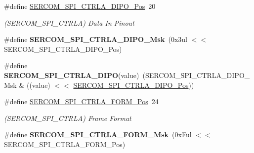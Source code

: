 \begin{DoxyCompactItemize}
\item 
\hypertarget{group___s_a_m_l21___s_e_r_c_o_m_gaefe3548f853ddf08ea9b9754bb4a77b1}{}\#define \hyperlink{group___s_a_m_l21___s_e_r_c_o_m_gaefe3548f853ddf08ea9b9754bb4a77b1}{S\+E\+R\+C\+O\+M\+\_\+\+S\+P\+I\+\_\+\+C\+T\+R\+L\+A\+\_\+\+D\+I\+P\+O\+\_\+\+Pos}~20\label{group___s_a_m_l21___s_e_r_c_o_m_gaefe3548f853ddf08ea9b9754bb4a77b1}

\begin{DoxyCompactList}\small\item\em (S\+E\+R\+C\+O\+M\+\_\+\+S\+P\+I\+\_\+\+C\+T\+R\+L\+A) Data In Pinout \end{DoxyCompactList}\item 
\hypertarget{group___s_a_m_l21___s_e_r_c_o_m_ga5b9e5ebd32c5551b385f5f245ffe0eab}{}\#define {\bfseries S\+E\+R\+C\+O\+M\+\_\+\+S\+P\+I\+\_\+\+C\+T\+R\+L\+A\+\_\+\+D\+I\+P\+O\+\_\+\+Msk}~(0x3ul $<$$<$ S\+E\+R\+C\+O\+M\+\_\+\+S\+P\+I\+\_\+\+C\+T\+R\+L\+A\+\_\+\+D\+I\+P\+O\+\_\+\+Pos)\label{group___s_a_m_l21___s_e_r_c_o_m_ga5b9e5ebd32c5551b385f5f245ffe0eab}

\item 
\hypertarget{group___s_a_m_l21___s_e_r_c_o_m_ga188fed2d9a46721deeb6465501975fb2}{}\#define {\bfseries S\+E\+R\+C\+O\+M\+\_\+\+S\+P\+I\+\_\+\+C\+T\+R\+L\+A\+\_\+\+D\+I\+P\+O}(value)~(S\+E\+R\+C\+O\+M\+\_\+\+S\+P\+I\+\_\+\+C\+T\+R\+L\+A\+\_\+\+D\+I\+P\+O\+\_\+\+Msk \& ((value) $<$$<$ \hyperlink{group___s_a_m_l21___s_e_r_c_o_m_gaefe3548f853ddf08ea9b9754bb4a77b1}{S\+E\+R\+C\+O\+M\+\_\+\+S\+P\+I\+\_\+\+C\+T\+R\+L\+A\+\_\+\+D\+I\+P\+O\+\_\+\+Pos}))\label{group___s_a_m_l21___s_e_r_c_o_m_ga188fed2d9a46721deeb6465501975fb2}

\item 
\hypertarget{group___s_a_m_l21___s_e_r_c_o_m_ga1442afbea00b3d181e673dfc47f448a5}{}\#define \hyperlink{group___s_a_m_l21___s_e_r_c_o_m_ga1442afbea00b3d181e673dfc47f448a5}{S\+E\+R\+C\+O\+M\+\_\+\+S\+P\+I\+\_\+\+C\+T\+R\+L\+A\+\_\+\+F\+O\+R\+M\+\_\+\+Pos}~24\label{group___s_a_m_l21___s_e_r_c_o_m_ga1442afbea00b3d181e673dfc47f448a5}

\begin{DoxyCompactList}\small\item\em (S\+E\+R\+C\+O\+M\+\_\+\+S\+P\+I\+\_\+\+C\+T\+R\+L\+A) Frame Format \end{DoxyCompactList}\item 
\hypertarget{group___s_a_m_l21___s_e_r_c_o_m_ga1a8b4fa482ff9ceb0826ab1dac369bb2}{}\#define {\bfseries S\+E\+R\+C\+O\+M\+\_\+\+S\+P\+I\+\_\+\+C\+T\+R\+L\+A\+\_\+\+F\+O\+R\+M\+\_\+\+Msk}~(0x\+Ful $<$$<$ S\+E\+R\+C\+O\+M\+\_\+\+S\+P\+I\+\_\+\+C\+T\+R\+L\+A\+\_\+\+F\+O\+R\+M\+\_\+\+Pos)\label{group___s_a_m_l21___s_e_r_c_o_m_ga1a8b4fa482ff9ceb0826ab1dac369bb2}


\end{DoxyCompactItemize}
